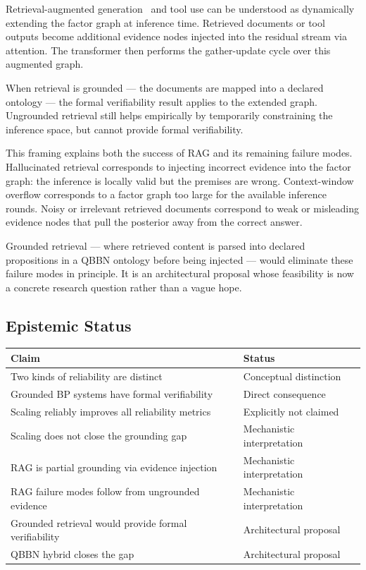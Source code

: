 Retrieval-augmented generation~\cite{lewis2020rag} and tool use can be
understood as dynamically extending the factor graph at inference time.
Retrieved documents or tool outputs become additional evidence nodes
injected into the residual stream via attention. The transformer then
performs the gather-update cycle over this augmented graph.

When retrieval is grounded --- the documents are mapped into a declared
ontology --- the formal verifiability result applies to the extended graph.
Ungrounded retrieval still helps empirically by temporarily constraining
the inference space, but cannot provide formal verifiability.

This framing explains both the success of RAG and its remaining failure
modes. Hallucinated retrieval corresponds to injecting incorrect evidence
into the factor graph: the inference is locally valid but the premises are
wrong. Context-window overflow corresponds to a factor graph too large for
the available inference rounds. Noisy or irrelevant retrieved documents
correspond to weak or misleading evidence nodes that pull the posterior
away from the correct answer.

Grounded retrieval --- where retrieved content is parsed into declared
propositions in a QBBN ontology before being injected --- would eliminate
these failure modes in principle. It is an architectural proposal whose
feasibility is now a concrete research question rather than a vague hope.

\subsection*{Epistemic Status}

\begin{center}
\begin{tabular}{ll}
\toprule
Claim & Status \\
\midrule
Two kinds of reliability are distinct & Conceptual distinction \\
Grounded BP systems have formal verifiability & Direct consequence \\
Scaling reliably improves all reliability metrics & Explicitly not claimed \\
Scaling does not close the grounding gap & Mechanistic interpretation \\
RAG is partial grounding via evidence injection & Mechanistic interpretation \\
RAG failure modes follow from ungrounded evidence & Mechanistic interpretation \\
Grounded retrieval would provide formal verifiability & Architectural proposal \\
QBBN hybrid closes the gap & Architectural proposal \\
\bottomrule
\end{tabular}
\end{center}